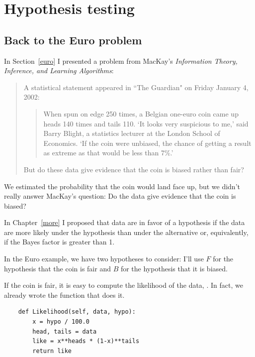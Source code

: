 \documentclass[12pt]{book}
\begin{document}
\chapter{Hypothesis testing}

\section{Back to the Euro problem}

In Section~\ref{euro} I presented a problem from MacKay's {\it Information
  Theory, Inference, and Learning Algorithms}:

\begin{quote}
A statistical statement appeared in ``The Guardian" on Friday January 4, 2002:

  \begin{quote}
        When spun on edge 250 times, a Belgian one-euro coin came
        up heads 140 times and tails 110.  `It looks very suspicious
        to me,' said Barry Blight, a statistics lecturer at the London
        School of Economics.  `If the coin were unbiased, the chance of
        getting a result as extreme as that would be less than 7\%.'
        \end{quote}

But do these data give evidence that the coin is biased rather than fair?
\end{quote}

We estimated the probability that the coin would
land face up, but we didn't really answer MacKay's question:
Do the data give evidence that the coin is biased?

In Chapter~\ref{more} I proposed that data are in favor of
a hypothesis if the data are more likely under the hypothesis than
under the alternative or, equivalently, if the Bayes factor is greater
than 1.

In the Euro example, we have two hypotheses to consider: I'll use
$F$ for the hypothesis that the coin is fair and $B$ for the hypothesis
that it is biased.

If the coin is fair, it is easy to compute the likelihood of the
data, .  In fact, we already wrote the function
that does it.

\begin{verbatim}
    def Likelihood(self, data, hypo):
        x = hypo / 100.0
        head, tails = data
        like = x**heads * (1-x)**tails
        return like
\end{verbatim}
\end{document}
